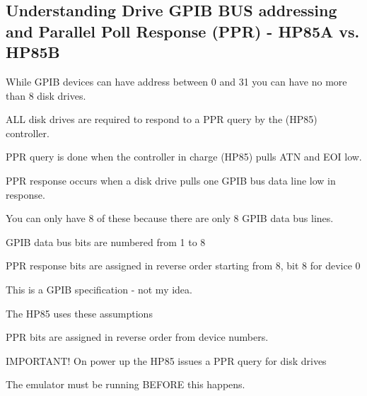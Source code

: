 \begin{DoxyItemize}
\begin{DoxyItemize}
\begin{DoxyItemize}
\begin{DoxyItemize}
\begin{DoxyItemize}
 \subsection*{Understanding Drive G\+P\+IB B\+US addressing and Parallel Poll Response (P\+PR) -\/ H\+P85A vs. H\+P85B}
\end{DoxyItemize}
\end{DoxyItemize}
\end{DoxyItemize}
\end{DoxyItemize}
\end{DoxyItemize}

While G\+P\+IB devices can have address between 0 and 31 you can have no more than 8 disk drives.
\begin{DoxyItemize}
\item A\+LL disk drives are required to respond to a P\+PR query by the (H\+P85) controller.
\begin{DoxyItemize}
\item P\+PR query is done when the controller in charge (H\+P85) pulls A\+TN and E\+OI low.
\item P\+PR response occurs when a disk drive pulls one G\+P\+IB bus data line low in response.
\begin{DoxyItemize}
\item You can only have 8 of these because there are only 8 G\+P\+IB data bus lines.
\begin{DoxyItemize}
\item G\+P\+IB data bus bits are numbered from 1 to 8
\item P\+PR response bits are assigned in reverse order starting from 8, bit 8 for device 0
\begin{DoxyItemize}
\item This is a G\+P\+IB specification -\/ not my idea.
\end{DoxyItemize}
\item The H\+P85 uses these assumptions
\begin{DoxyItemize}
\item P\+PR bits are assigned in reverse order from device numbers.
\end{DoxyItemize}
\end{DoxyItemize}
\end{DoxyItemize}
\end{DoxyItemize}
\item I\+M\+P\+O\+R\+T\+A\+N\+T! On power up the H\+P85 issues a P\+PR query for disk drives
\begin{DoxyItemize}
\item The emulator must be running B\+E\+F\+O\+RE this happens.

\end{DoxyItemize}
\end{DoxyItemize}
